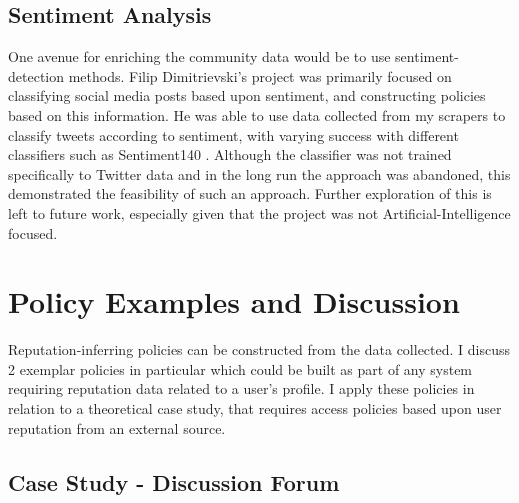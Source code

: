 



\subsection{Sentiment Analysis}

One avenue for enriching the community data would be to use sentiment-detection methods. Filip Dimitrievski's project was primarily focused on classifying social media posts based upon sentiment, and constructing policies based on this information. He was able to use data collected from my scrapers to classify tweets according to sentiment, with varying success with different classifiers such as Sentiment140 \cite{}. Although the classifier was not trained specifically to Twitter data and in the long run the approach was abandoned, this demonstrated the feasibility of such an approach. Further exploration of this is left to future work, especially given that the project was not Artificial-Intelligence focused.

\section{Policy Examples and Discussion}

Reputation-inferring policies can be constructed from the data collected. I discuss 2 exemplar policies in particular which could be built as part of any system requiring reputation data related to a user's profile. I apply these policies in relation to a theoretical case study, that requires access policies based upon user reputation from an external source. 

\subsection{Case Study - Discussion Forum}

